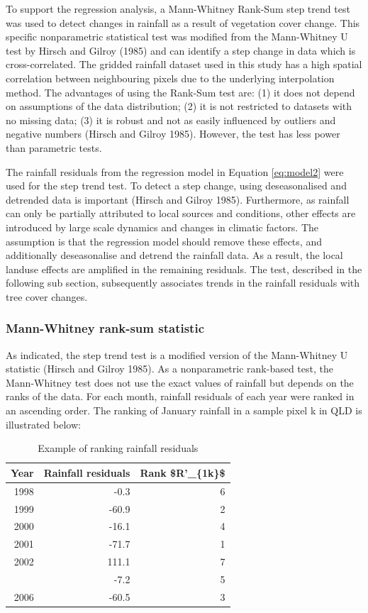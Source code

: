 \documentclass[fleqn,10pt,lineno]{wlpeerj} %
\begin{document}
To support the regression analysis, a Mann-Whitney Rank-Sum step trend
test was used to detect changes in rainfall as a result of vegetation
cover change. This specific nonparametric statistical test was modified
from the Mann-Whitney U test by Hirsch and Gilroy (1985) and can
identify a step change in data which is cross-correlated. The gridded
rainfall dataset used in this study has a high spatial correlation
between neighbouring pixels due to the underlying interpolation method.
The advantages of using the Rank-Sum test are: (1) it does not depend on
assumptions of the data distribution; (2) it is not restricted to
datasets with no missing data; (3) it is robust and not as easily
influenced by outliers and negative numbers (Hirsch and Gilroy 1985).
However, the test has less power than parametric tests.

The rainfall residuals from the regression model in Equation
\eqref{eq:model2} were used for the step trend test. To detect a step
change, using deseasonalised and detrended data is important (Hirsch and
Gilroy 1985). Furthermore, as rainfall can only be partially attributed
to local sources and conditions, other effects are introduced by large
scale dynamics and changes in climatic factors. The assumption is that
the regression model should remove these effects, and additionally
deseasonalise and detrend the rainfall data. As a result, the local
landuse effects are amplified in the remaining residuals. The test,
described in the following sub section, subsequently associates trends
in the rainfall residuals with tree cover changes.

\subsubsection{Mann-Whitney rank-sum
statistic}\label{mann-whitney-rank-sum-statistic}

As indicated, the step trend test is a modified version of the
Mann-Whitney U statistic (Hirsch and Gilroy 1985). As a nonparametric
rank-based test, the Mann-Whitney test does not use the exact values of
rainfall but depends on the ranks of the data. For each month, rainfall
residuals of each year were ranked in an ascending order. The ranking of
January rainfall in a sample pixel k in QLD is illustrated below:

\begin{table}[t]

\caption{\label{tab:exampleRank}Example of ranking rainfall residuals}
\centering
\begin{tabular}{rrr}
\toprule
Year & Rainfall residuals & Rank \$R'\_\{1k\}\$\\
\midrule
1998 & -0.3 & 6\\
1999 & -60.9 & 2\\
2000 & -16.1 & 4\\
2001 & -71.7 & 1\\
2002 & 111.1 & 7\\
\addlinespace
2005 & -7.2 & 5\\
2006 & -60.5 & 3\\
\bottomrule
\end{tabular}
\end{table}
\end{document}
